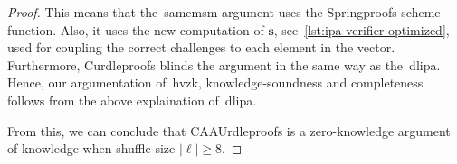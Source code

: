 \begin{proof}
    This means that the~\gls{samemsm} argument uses the Springproofs scheme function.
    Also, it uses the new computation of $\mathbf{s}$, see~\autoref{lst:ipa-verifier-optimized}, used for coupling the correct challenges to each element in the vector.
    Furthermore, Curdleproofs blinds the argument in the same way as the~\gls{dlipa}.
    Hence, our argumentation of~\gls{hvzk}, knowledge-soundness and completeness follows from the above explaination of~\gls{dlipa}.

    From this, we can conclude that CAAUrdleproofs is a zero-knowledge argument of knowledge when shuffle size $|\ell|\geq8$.
\end{proof}



